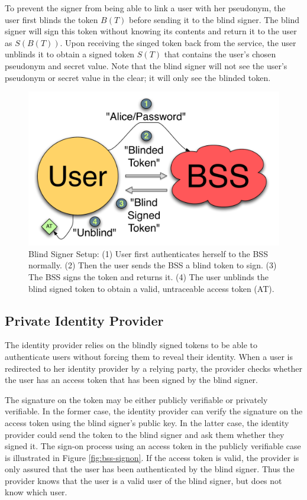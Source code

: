 \documentclass[11pt]{llncs}
\begin{document}
To prevent the signer from being able to link a user with her
pseudonym, the user first blinds the token $B(T)$ before sending it to
the blind signer. The blind signer will sign this token without
knowing its contents and return it to the user as $S(B(T))$. Upon
receiving the singed token back from the service, the user unblinds it
to obtain a signed token $S(T)$ that contains the user's chosen
pseudonym and secret value. Note that the blind signer will not see
the user's pseudonym or secret value in the clear; it will only see
the blinded token.

\begin{figure}
  \centering
  \includegraphics[scale=0.6]{figs/fig-bss-setup-color.pdf}
  \caption{Blind Signer Setup: (1) User first authenticates herself to
    the BSS normally. (2) Then the user sends the BSS a blind token to
    sign. (3) The BSS signs the token and returns it. (4) The user
    unblinds the blind signed token to obtain a valid, untraceable
    access token (AT).}
  \label{fig:bss-setup}
\end{figure}

\subsection{Private Identity Provider}

The identity provider relies on the blindly signed tokens to be able
to authenticate users without forcing them to reveal their
identity. When a user is redirected to her identity provider by a
relying party, the provider checks whether the user has an access
token that has been signed by the blind signer.

The signature on the token may be either publicly verifiable or
privately verifiable. In the former case, the identity provider can
verify the signature on the access token using the blind signer's
public key. In the latter case, the identity provider could send the
token to the blind signer and ask them whether they signed it. The
sign-on process using an access token in the publicly verifiable case
is illustrated in Figure \ref{fig:bss-signon}. If the access token is
valid, the provider is only assured that the user has been
authenticated by the blind signer. Thus the provider knows that the
user is a valid user of the blind signer, but does not know which
user.
\end{document}
